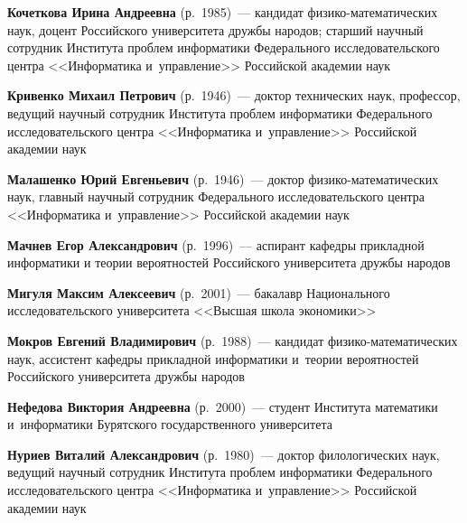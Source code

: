 \begin{multicols}{2}
\noindent
\textbf{Кочеткова Ирина Андреевна} (р.\ 1985)~--- 
кандидат фи\-зи\-ко-ма\-те\-ма\-ти\-че\-ских наук, доцент Российского университета друж\-бы народов; 
старший научный сотрудник Института проб\-лем информатики Федерального исследовательского цент\-ра <<Информатика и~управ\-ле\-ние>>
 Российской академии наук

\vspace*{4pt}

\noindent
\textbf{Кривенко Михаил Петрович} (р.\ 1946)~--- 
доктор технических наук, профессор, ведущий научный сотрудник Института проб\-лем информатики Федерального исследовательского цент\-ра 
<<\mbox{Информатика} и~управ\-ле\-ние>> Российской академии наук

\vspace*{4pt}

\noindent
\textbf{Малашенко Юрий Евгеньевич} (р.\ 1946)~--- 
доктор фи\-зи\-ко-ма\-те\-ма\-ти\-че\-ских наук, главный научный сотрудник Федерального исследовательского цент\-ра 
<<Информатика и~управ\-ле\-ние>> Российской академии наук


\pagebreak

\noindent
\textbf{Мачнев Егор Александрович} (р.\ 1996)~--- 
аспирант кафедры прикладной информатики и теории вероятностей Российского университета друж\-бы на\-родов

\vspace*{4pt}

\noindent
\textbf{Мигуля Максим Алексеевич} (р.\ 2001)~--- бакалавр Национального исследовательского университета <<Высшая школа экономики>>

\vspace*{4pt}

\noindent
\textbf{Мокров Евгений Владимирович} (р.\ 1988)~--- кандидат фи\-зи\-ко-ма\-те\-ма\-ти\-че\-ских наук, 
ассистент кафедры прикладной информатики и~тео\-рии вероятностей Российского университета друж\-бы народов

\vspace*{4pt}

\noindent
\textbf{Нефедова Виктория Андреевна} (р.\ 2000)~--- студент Института математики и~информатики Бурятского государственного университета

\vspace*{4pt}

\noindent
\textbf{Нуриев Виталий Александрович} (р.\ 1980)~--- 
доктор филологических наук, ведущий научный сотрудник Института проб\-лем информатики Федерального исследовательского центра <<\mbox{Информатика} и~управ\-ле\-ние>>
 Российской академии наук


\end{multicols}
